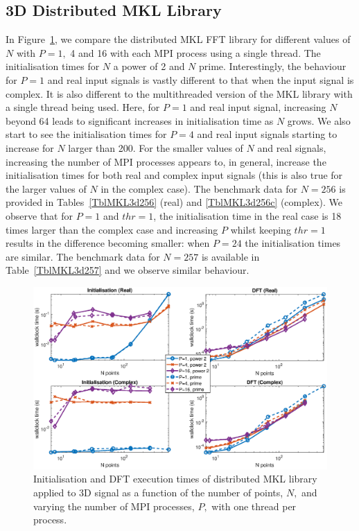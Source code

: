 \documentclass[a4paper]{article}
\begin{document}
\subsection{3D Distributed MKL Library}\label{Sec:3DDistMKL}
In Figure~\ref{3DDistMKL}, we compare the distributed MKL FFT library
for different values of $N$ with $P=1,$ 4 and 16 with each MPI process
using a single thread. The initialisation times for $N$ a power of 2
and $N$ prime. Interestingly, the behaviour for $P=1$ and real input
signals is vastly different to that when the input signal is
complex. It is also different to the multithreaded version of the MKL
library with a single thread being used. Here, for $P=1$ and real
input signal, increasing $N$ beyond 64 leads to significant increases
in initialisation time as $N$ grows. We also start to see the
initialisation times for $P=4$ and real input signals starting to
increase for $N$ larger than 200. For the smaller values of $N$ and
real signals, increasing the number of MPI processes appears to, in
general, increase the initialisation times for both real and complex
input signals (this is also true for the larger values of $N$ in the
complex case). The benchmark data for $N=256$ is provided in
Tables~\ref{TblMKL3d256} (real) and \ref{TblMKL3d256c} (complex). We
observe that for $P=1$ and $thr=1$, the initialisation time in the
real case is 18 times larger than the complex case and increasing $P$
whilst keeping $thr=1$ results in the difference becoming smaller:
when $P=24$ the initialisation times are similar. The benchmark data
for $N=257$ is available in Table~\ref{TblMKL3d257} and we observe
similar behaviour.

\begin{figure}[htb]
    \centering
    \includegraphics[width=0.9\linewidth]{../results/mkl_3d_mpi.eps}
  \caption{Initialisation and DFT execution times of distributed MKL library applied to 3D signal as a function of the
    number of points, $N,$ and varying the number of MPI processes, $P,$ with one thread per process.}
  \label{3DDistMKL}
\end{figure}
\end{document}
